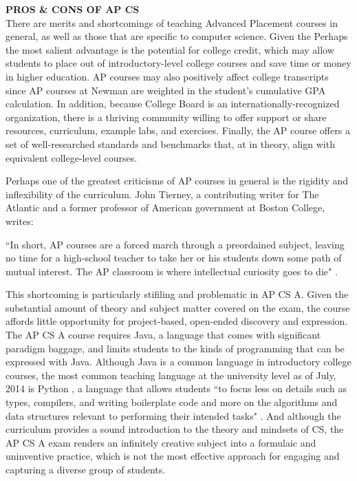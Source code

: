 \textbf{PROS \& CONS OF AP CS} \\
There are merits and shortcomings of teaching Advanced Placement courses in general, as well as those that are specific to computer science. Given the 
Perhaps the most salient advantage is the potential for college credit, which may allow students to place out of introductory-level college courses and save time or money in higher education. AP courses may also positively affect college transcripts since AP courses at Newman are weighted in the student’s cumulative GPA calculation. In addition, because College Board is an internationally-recognized organization, there is a thriving community willing to offer support or share resources, curriculum, example labs, and exercises. Finally, the AP course offers a set of well-researched standards and benchmarks that, at in theory, align with equivalent college-level courses. \par
Perhaps one of the greatest criticisms of AP courses in general is the rigidity and inflexibility of the curriculum. John Tierney, a contributing writer for The Atlantic and a former professor of American government at Boston College, writes:
\begin{blockquote}
	``In short, AP courses are a forced march through a preordained subject, leaving no time for a high-school teacher to take her or his students down some path of mutual interest. The AP classroom is where intellectual curiosity goes to die" \cite{atlantic}.
	\end{blockquote}
This shortcoming is particularly stifiling and problematic in AP CS A. Given the substantial amount of theory and subject matter covered on the exam, the course affords little opportunity for project-based, open-ended discovery and expression. The AP CS A course requires Java, a language that comes with significant paradigm baggage, and limits students to the kinds of programming that can be expressed with Java. Although Java is a common language in introductory college courses, the most common teaching language at the university level as of July, 2014 is Python \cite{unilang}, a language that allows students ``to focus less on details such as types, compilers, and writing boilerplate code and more on the algorithms and data structures relevant to performing their intended tasks" \cite{guo}. And although the curriculum provides a sound introduction to the theory and mindsets of CS, the AP CS A exam renders an infinitely creative subject into a formulaic and uninventive practice, which is not the most effective approach for engaging and capturing a diverse group of students. \par 
